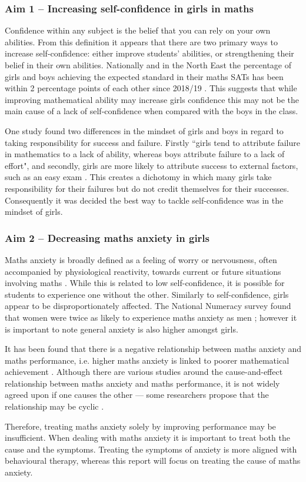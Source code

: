 \documentclass[11pt, a4paper, notitlepage]{article}
\begin{document}
\subsubsection*{Aim 1 -- Increasing self-confidence in girls in maths} 
Confidence within any subject is the belief that you can rely on your own abilities. From this definition it appears that there are two primary ways to increase self-confidence: either improve students' abilities, or strengthening their belief in their own abilities. Nationally and in the North East the percentage of girls and boys achieving the expected standard in their maths SATs has been within 2 percentage points of each other since 2018/19 \cite{maths_SATs_stats}. This suggests that while improving mathematical ability may increase girls confidence this may not be the main cause of a lack of self-confidence when compared with the boys in the class.
\par
One study  found two differences in the mindset of girls and boys in regard to taking responsibility for success and failure. Firstly ``girls tend to attribute failure in mathematics to a lack of ability, whereas boys attribute failure to a lack of effort", and secondly, girls are more likely to attribute success to external factors, such as an easy exam \cite{Georgiou01122007}. This creates a dichotomy in which many girls take responsibility for their failures but do not credit themselves for their successes. Consequently it was decided the best way to tackle self-confidence was in the mindset of girls.
\subsubsection*{Aim 2 -- Decreasing maths anxiety in girls}
Maths anxiety is broadly defined as a feeling of worry or nervousness, often accompanied by physiological reactivity, towards current or future situations involving maths \cite{Luttenberger:2018}. While this is related to low self-confidence, it is possible for students to experience one without the other. Similarly to self-confidence, girls appear to be disproportionately affected. The National Numeracy survey found that women were twice as likely to experience maths anxiety as men \cite{NationalNumeracy_anxiety}; however it is important to note general anxiety is also higher amongst girls.
\par
It has been found that there is a negative relationship between maths anxiety and maths performance, i.e. higher maths anxiety is linked to poorer mathematical achievement \cite{Chang:2016}. 
Although there are various studies around the cause-and-effect relationship between maths anxiety and maths performance, it is not widely agreed upon if one causes the other --- some researchers propose that the relationship may be cyclic \cite{Chang:2016}. 
\par
Therefore, treating maths anxiety solely by improving performance may be insufficient. When dealing with maths anxiety it is important to treat both the cause and the symptoms. Treating the symptoms of anxiety is more aligned with behavioural therapy,  whereas this report will focus on treating the cause of maths anxiety.
\end{document}
